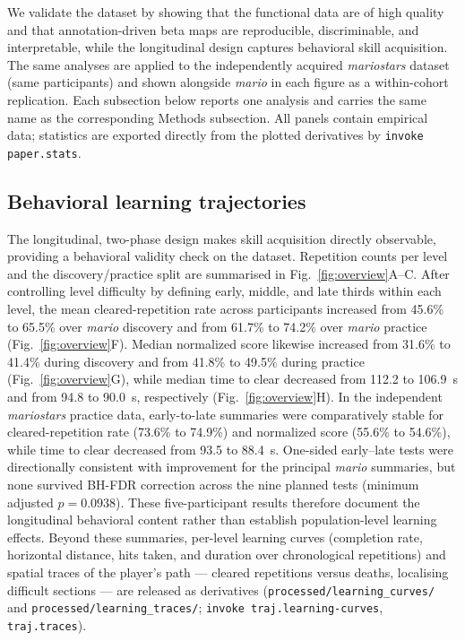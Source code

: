 \documentclass{article}
\begin{document}
We validate the dataset by showing that the functional data are of high quality and that
annotation-driven beta maps are reproducible, discriminable, and interpretable, while the
longitudinal design captures behavioral skill acquisition. The same analyses are applied to the
independently acquired \textit{mariostars} dataset (same participants) and shown alongside
\textit{mario} in each figure as a within-cohort replication. Each subsection below reports one
analysis and carries the same name as the corresponding Methods subsection. All panels contain
empirical data; statistics are exported directly from the plotted derivatives by
\texttt{invoke paper.stats}.

\subsection*{Behavioral learning trajectories}
\label{sec:validation:traj}
The longitudinal, two-phase design makes skill acquisition directly observable, providing a
behavioral validity check on the dataset. Repetition counts per level and the discovery/practice
split are summarised in Fig.~\ref{fig:overview}A--C. After controlling level difficulty by defining
early, middle, and late thirds within each level, the mean cleared-repetition rate across
participants increased from 45.6\% to 65.5\% over \textit{mario} discovery and from 61.7\% to
74.2\% over \textit{mario} practice (Fig.~\ref{fig:overview}F). Median normalized score likewise
increased from 31.6\% to 41.4\% during discovery and from 41.8\% to 49.5\% during practice
(Fig.~\ref{fig:overview}G), while median time to clear decreased from 112.2 to 106.9~s and from
94.8 to 90.0~s, respectively (Fig.~\ref{fig:overview}H). In the independent \textit{mariostars}
practice data, early-to-late summaries were comparatively stable for cleared-repetition rate
(73.6\% to 74.9\%) and normalized score (55.6\% to 54.6\%), while time to clear decreased from
93.5 to 88.4~s. One-sided early--late tests were directionally consistent with improvement for
the principal \textit{mario} summaries, but none survived BH-FDR correction across the nine
planned tests (minimum adjusted $p=0.0938$). These five-participant results therefore document
the longitudinal behavioral content rather than establish population-level learning effects.
Beyond these summaries, per-level learning curves
(completion rate, horizontal distance, hits taken, and duration over chronological repetitions)
and spatial traces of the player's path — cleared repetitions versus deaths, localising difficult
sections — are released as derivatives (\texttt{processed/learning\_curves/} and
\texttt{processed/learning\_traces/}; \texttt{invoke traj.learning-curves}, \texttt{traj.traces}).
\end{document}
